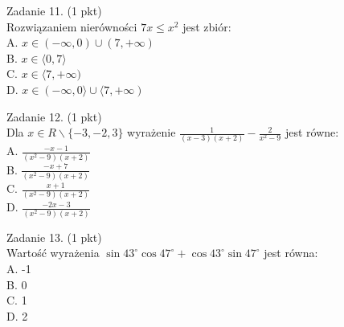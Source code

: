 \documentclass[10pt]{article}
\begin{document}
Zadanie 11. (1 pkt)\\
Rozwiązaniem nierówności \(7 x \leq x^{2}\) jest zbiór:\\
A. \(x \in(-\infty, 0) \cup(7,+\infty)\)\\
B. \(x \in\langle 0,7\rangle\)\\
C. \(x \in\langle 7,+\infty)\)\\
D. \(x \in(-\infty, 0\rangle \cup\langle 7,+\infty)\)

Zadanie 12. (1 pkt)\\
Dla \(x \in R \backslash\{-3,-2,3\}\) wyrażenie \(\frac{1}{(x-3)(x+2)}-\frac{2}{x^{2}-9}\) jest równe:\\
A. \(\frac{-x-1}{\left(x^{2}-9\right)(x+2)}\)\\
B. \(\frac{-x+7}{\left(x^{2}-9\right)(x+2)}\)\\
C. \(\frac{x+1}{\left(x^{2}-9\right)(x+2)}\)\\
D. \(\frac{-2 x-3}{\left(x^{2}-9\right)(x+2)}\)

Zadanie 13. (1 pkt)\\
Wartość wyrażenia \(\sin 43^{\circ} \cos 47^{\circ}+\cos 43^{\circ} \sin 47^{\circ}\) jest równa:\\
A. -1\\
B. 0\\
C. 1\\
D. 2
\end{document}
